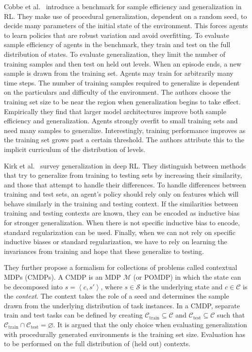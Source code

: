 Cobbe et al.~\cite{cobbe_leveraging_2020} introduce a benchmark for sample efficiency and generalization in RL.
They make use of procedural generalization, dependent on a random seed, to decide many parameters of the initial state of the environment.
This forces agents to learn policies that are robust variation and avoid overfitting.
To evaluate sample efficiency of agents in the benchmark, they train and test on the full distribution of states.
To evaluate generalization, they limit the number of training samples and then test on held out levels.
When an episode ends, a new sample is drawn from the training set.
Agents may train for arbitrarily many time steps.
The number of training samples required to generalize is dependent on the particulars and difficulty of the environment.
The authors choose the training set size to be near the region when generalization begins to take effect.
Empirically they find that larger model architectures improve both sample efficiency and generalization.
Agents strongly overfit to small training sets and need many samples to generalize.
Interestingly, training performance improves as the training set grows past a certain threshold.
The authors attribute this to the implicit curriculum of the distribution of levels.

Kirk et al.~\cite{kirk_survey_2022} survey generalization in deep RL.
They distinguish between methods that try to generalize from training to testing sets by increasing their similarity, and those that attempt to handle their differences.
To handle differences between training and test sets, an agent's policy should rely only on features which will behave similarly in the training and testing context.
If the similarities between training and testing contexts are known, they can be encoded as inductive bias for stronger generalization.
When there is not specific inductive bias to encode, standard regularization can be used.
Finally, when we can not rely on specific inductive biases or standard regularization, we have to rely on learning the invariances from training and hope that these generalize to testing.

They further propose a formalism for collections of problems called contextual MDPs (CMDPs).
A CMDP is an MDP \(\mathcal{M}\) (or POMDP) in which the state can be decomposed into \(s = \left\langle c, s' \right\rangle\),
where \(s \in \mathcal{S}\) is the underlying state and \(c \in \mathcal{C}\) is the \textit{context}.
The context takes the role of a seed and determines the sample drawn from the underlying distribution of task instances.
In a CMDP, separate train and test tasks can be defined by creating \(\mathcal{C}_\text{train} \subseteq \mathcal{C}\) and \(\mathcal{C}_\text{test} \subseteq \mathcal{C}\) such that \(\mathcal{C}_\text{train} \cap \mathcal{C}_\text{test} = \varnothing\).
It is argued that the only choice when evaluating generalization with procedurally generated environments is the training set size.
Evaluation has to be performed on the full distribution of (held out) contexts.

